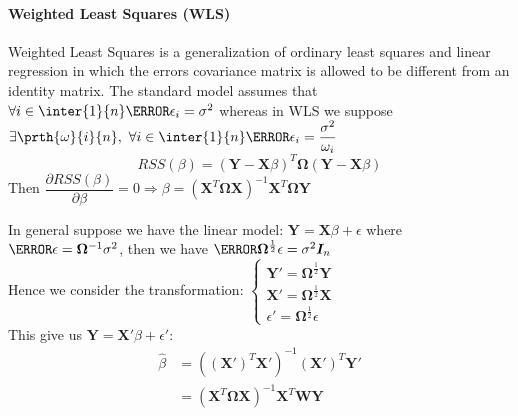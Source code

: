 %
\paragraph{Weighted Least Squares (WLS)}
Weighted Least Squares is a generalization of ordinary least squares and linear regression in
which the errors covariance matrix is allowed to be different from an identity matrix. 
The standard model assumes that $\forall i\in\inter{1}{n}\V{\epsilon_{i}}=\sigma^{2}$ whereas in
WLS we suppose $\exists\prth{\omega}{i}{n},~\forall i\in\inter{1}{n}\V{\epsilon_{i}}=
\dfrac{\sigma^{2}}{\omega_{i}}$ 
$$RSS(\beta)=\left(\bm{Y}-\bm{X}\beta\right)^{T}\bm{\Omega}\left(\bm{Y}-\bm{X}\beta\right)$$
Then $\dfrac{\partial RSS(\beta)}{\partial\beta}=0\Rightarrow \beta=
\left(\bm{X}^{T}\bm{\Omega}\bm{X}\right)^{-1}\bm{X}^{T}\bm{\Omega}\bm{Y}$

In general suppose we have the linear model: 
$\bm{Y} = \bm{X}\beta + \epsilon$ where $\V{\epsilon}=\bm{\Omega}^{-1}\sigma^{2}$, then we have
$\V{\bm{\Omega}^{\frac{1}{2}}\epsilon}=\sigma^{2}\bm{I}_{n}$\\
Hence we consider the transformation:
$
\begin{cases}
	\bm{Y}'=\bm{\Omega}^{\frac{1}{2}}\bm{Y}\\
	\bm{X}'= \bm{\Omega}^{\frac{1}{2}}\bm{X}\\
	\epsilon' = \bm{\Omega}^{\frac{1}{2}}\epsilon
\end{cases}
$\\
This give us $\bm{Y}=\bm{X}'\beta+\epsilon'$:
\begin{align*}
	\hat{\beta} &= \left( (\bm{X}')^{T}\bm{X}'\right)^{-1}(\bm{X}')^{T}\bm{Y}'\\
	&= \left(\bm{X}^{T}\bm{\Omega}\bm{X}\right)^{-1}\bm{X}^{T}\bm{W}\bm{Y}
\end{align*}

